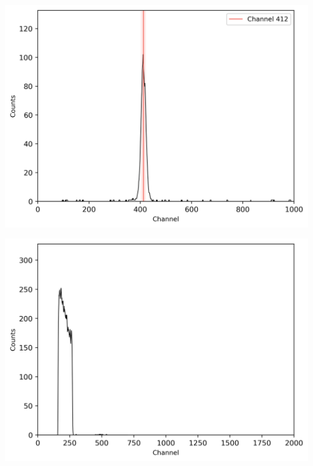 \begin{center}
    \begin{adjustbox}{max width=\linewidth, keepaspectratio}
        \includegraphics[]{png/60CoZeitspektrum60ns}
    \end{adjustbox}
    \label{fig:}
\end{center}
%
\begin{center}
    \begin{adjustbox}{max width=\linewidth, keepaspectratio}
        \includegraphics[]{png/signal2eneriewindow}
    \end{adjustbox}
    \label{fig:}
\end{center}
%
